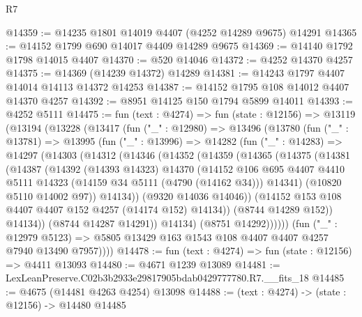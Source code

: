 \begin{lexlean}{R7}
\begin{coremodule}
@14359 := @14235 @1801 @14019 @4407 (@4252 @14289 @9675) @14291
@14365 := @14152 @1799 @690 @14017 @4409 @14289 @9675
@14369 := @14140 @1792 @1798 @14015 @4407
@14370 := @520 @14046
@14372 := @4252 @14370 @4257
@14375 := @14369 (@14239 @14372) @14289
@14381 := @14243 @1797 @4407 @14014 @14113 @14372 @14253
@14387 := @14152 @1795 @108 @14012 @4407 @14370 @4257
@14392 := @8951 @14125 @150 @1794 @5899 @14011
@14393 := @4252 @5111
@14475 := fun (text : @4274) =>
  fun (state : @12156) =>
  @13119
    (@13194
      (@13228
        (@13417
          (fun ("_" : @12980) =>
          @13496
            (@13780
              (fun ("_" : @13781) =>
              @13995
                (fun ("_" : @13996) =>
                @14282
                  (fun ("_" : @14283) =>
                  @14297
                    (@14303
                      (@14312
                        (@14346
                          (@14352
                            (@14359
                              (@14365
                                (@14375
                                  (@14381
                                    (@14387
                                      (@14392
                                        (@14393 @14323)
                                        @14370
                                        (@14152
                                          @106
                                          @695
                                          @4407
                                          @4410
                                          @5111
                                          @14323
                                          (@14159 @34 @5111 (@4790 (@14162 @34)))
                                          @14341)
                                        (@10820 @5110 @14002 @97))
                                      @14134))
                                  (@9320 @14036 @14046))
                                (@14152 @153 @108 @4407 @4407 @152 @4257 (@14174 @152) @14134))
                              (@8744 @14289 @152))
                            @14134))
                        (@8744 @14287 @14291))
                      @14134)
                    (@8751 @14292))))))
          (fun ("_" : @12979 @5123) =>
          @5805 @13429 @163 @1543 @108 @4407 @4407 @4257 @7940 @13490 @7957))))
@14478 := fun (text : @4274) => fun (state : @12156) => @4411 @13093
@14480 := @4671 @1239 @13089
@14481 := LexLeanPreserve.C02b3b2933e29817905bdab0429777780.R7.__fits_18
@14485 := @4675 (@14481 @4263 @4254) @13098
@14488 := (text : @4274) -> (state : @12156) -> @14480 @14485

\end{coremodule}
\end{lexlean}
